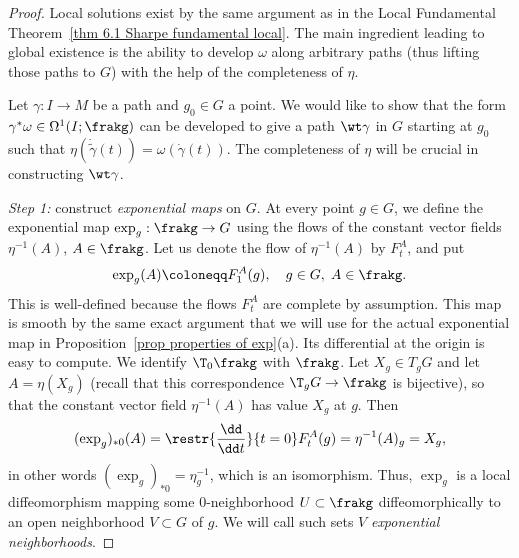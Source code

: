 \begin{proof}
    Local solutions exist by the same argument as in the Local Fundamental Theorem~\ref{thm 6.1 Sharpe fundamental local}. The main ingredient leading to global existence is the ability to develop $\omega$ along arbitrary paths (thus lifting those paths to $G$) with the help of the completeness of $\eta$.

    Let $\gamma:I\to M$ be a path and $g_0\in G$ a point. We would like to show that the form $\gamma^\ast \omega\in \Omega^1(I;\frakg)$ can be developed to give a path $\wt\gamma$ in $G$ starting at $g_0$ such that $\eta(\dot{\tilde\gamma}(t))=\omega(\dot\gamma(t))$. The completeness of $\eta$ will be crucial in constructing $\wt\gamma$.

    \emph{Step 1:} construct \emph{exponential maps} on $G$. At every point $g\in G$, we define the exponential map $\exp_g:\frakg\to G$ using the flows of the constant vector fields $\eta^{-1}(A)$, $A\in\frakg$. Let us denote the flow of $\eta^{-1}(A)$ by $F^A_t$, and put 
    \[\exp_g(A)\coloneqq F^A_1(g),\quad g\in G,\;A\in\frakg.\]
    This is well-defined because the flows $F^A_t$ are complete by assumption. This map is smooth by the same exact argument that we will use for the actual exponential map in Proposition~\ref{prop properties of exp}(a). Its differential at the origin is easy to compute. We identify $\T_0\frakg$ with $\frakg$. Let $X_g\in T_g G$ and let $A=\eta(X_g)$ (recall that this correspondence $\T_g G\to \frakg$ is bijective), so that the constant vector field $\eta^{-1}(A)$ has value $X_g$ at $g$. Then 
    \[(\exp_g)_{\ast 0}(A)=\restr{\frac{\dd}{\dd t}}{t=0}F^A_t(g)=\eta^{-1}(A)_g=X_g,\]
    in other words $(\exp_g)_{\ast 0}=\eta^{-1}_g$, which is an isomorphism. Thus, $\exp_g$ is a local diffeomorphism mapping some $0$-neighborhood $U\subset \frakg$ diffeomorphically to an open neighborhood $V\subset G$ of $g$. We will call such sets $V$ \emph{exponential neighborhoods}.

    

\end{proof}
